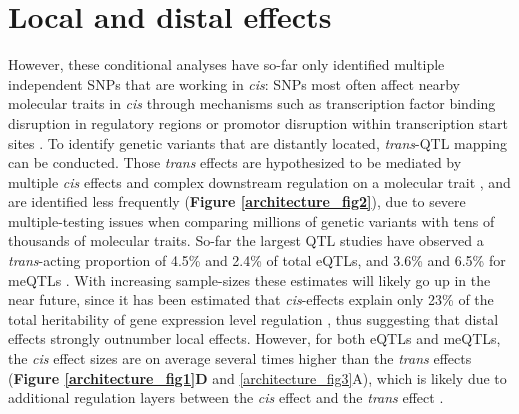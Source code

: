\section{Local and distal effects}
However, these conditional analyses have so-far only identified multiple independent SNPs that are working in \textit{cis}: SNPs most often affect nearby molecular traits in \textit{cis} through mechanisms such as transcription factor binding disruption in regulatory regions or promotor disruption within transcription start sites \cite{brownIntegrativeModelingEQTLs2013}. To identify genetic variants that are distantly located, \textit{trans}-QTL mapping can be conducted. Those \textit{trans} effects are hypothesized to be mediated by multiple \textit{cis} effects and complex downstream regulation on a molecular trait \cite{westraSystematicIdentificationTrans2013,wongInterplayCisTrans2017}, and are identified less frequently (\textbf{Figure \ref{architecture_fig2}}), due to severe multiple-testing issues when comparing millions of genetic variants with tens of thousands of molecular traits. So-far the largest QTL studies have observed a \textit{trans}-acting proportion of 4.5\% \cite{westraSystematicIdentificationTrans2013} and 2.4\% \cite{wrightHeritabilityGenomicsGene2014} of total eQTLs, and 3.6\% \cite{bonderDiseaseVariantsAlter2017} and 6.5\% for meQTLs \cite{gauntSystematicIdentificationGenetic2016}. With increasing sample-sizes these estimates will likely go up in the near future, since it has been estimated that \textit{cis}-effects explain only 23\% of the total heritability of gene expression level regulation \cite{wrightHeritabilityGenomicsGene2014}, thus suggesting that distal effects strongly outnumber local effects. However, for both eQTLs and meQTLs, the \textit{cis} effect sizes are on average several times higher than the \textit{trans} effects (\textbf{Figure \ref{architecture_fig1}D} and \ref{architecture_fig3}A), which is likely due to additional regulation layers between the \textit{cis} effect and the \textit{trans} effect \cite{albertRoleRegulatoryVariation2015}. 

